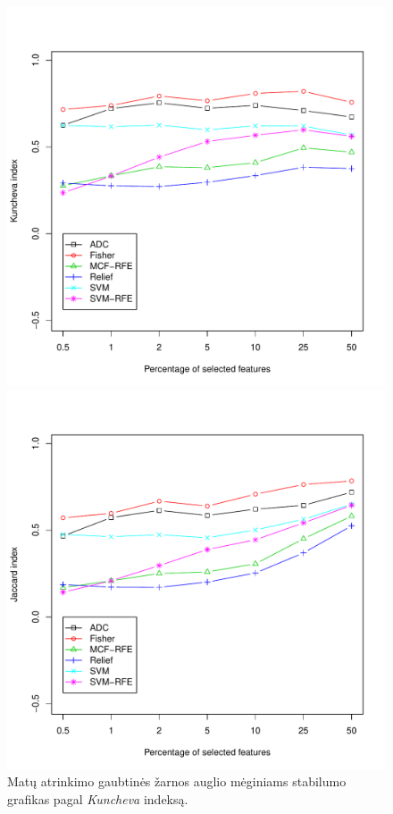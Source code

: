 \begin{figure}[H]
\capstart
\begin{minipage}[b]{0.47\linewidth}
\centering
\includegraphics[width=.85\textwidth]{../bachelor/images/nncolon_robustness_kuncheva.pdf}
\caption{Matų atrinkimo gaubtinės žarnos auglio mėginiams stabilumo grafikas pagal \textit{Kuncheva} indeksą.}
\label{fig:robk_colon}
\end{minipage}
\hspace{0.2cm}
\begin{minipage}[b]{0.47\linewidth}
\centering
\includegraphics[width=.85\textwidth]{../bachelor/images/nncolon_robustness_jaccard.pdf}

\end{minipage}
\end{figure}
